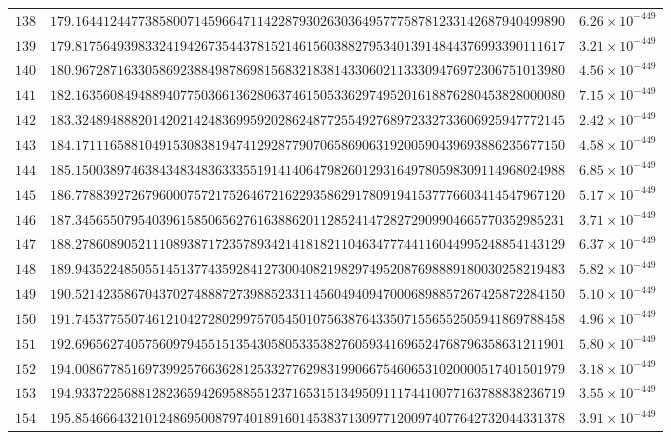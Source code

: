 \documentclass[12pt,reqno]{amsart}
\theoremstyle{remark}
\begin{document}
\begin{longtable}{clc}
$138$ & $179.1644124477385800714596647114228793026303649577758781233142687940499890$ & $6.26\times 10^{-449}$ \\
$139$ & $179.8175649398332419426735443781521461560388279534013914844376993390111617$ & $3.21\times 10^{-449}$ \\
$140$ & $180.9672871633058692388498786981568321838143306021133309476972306751013980$ & $4.56\times 10^{-449}$ \\
$141$ & $182.1635608494889407750366136280637461505336297495201618876280453828000080$ & $7.15\times 10^{-449}$ \\
$142$ & $183.3248948882014202142483699592028624877255492768972332733606925947772145$ & $2.42\times 10^{-449}$ \\
$143$ & $184.1711165881049153083819474129287790706586906319200590439693886235677150$ & $4.58\times 10^{-449}$ \\
$144$ & $185.1500389746384348348363335519141406479826012931649780598309114968024988$ & $6.85\times 10^{-449}$ \\
$145$ & $186.7788392726796000757217526467216229358629178091941537776603414547967120$ & $5.17\times 10^{-449}$ \\
$146$ & $187.3456550795403961585065627616388620112852414728272909904665770352985231$ & $3.71\times 10^{-449}$ \\
$147$ & $188.2786089052111089387172357893421418182110463477744116044995248854143129$ & $6.37\times 10^{-449}$ \\
$148$ & $189.9435224850551451377435928412730040821982974952087698889180030258219483$ & $5.82\times 10^{-449}$ \\
$149$ & $190.5214235867043702748887273988523311456049409470006898857267425872284150$ & $5.10\times 10^{-449}$ \\
$150$ & $191.7453775507461210427280299757054501075638764335071556552505941869788458$ & $4.96\times 10^{-449}$ \\
$151$ & $192.6965627405756097945515135430580533538276059341696524768796358631211901$ & $5.80\times 10^{-449}$ \\
$152$ & $194.0086778516973992576636281253327762983199066754606531020000517401501979$ & $3.18\times 10^{-449}$ \\
$153$ & $194.9337225688128236594269588551237165315134950911174410077163788838236719$ & $3.55\times 10^{-449}$ \\
$154$ & $195.8546664321012486950087974018916014538371309771200974077642732044331378$ & $3.91\times 10^{-449}$ \\

\end{longtable}
\end{document}
